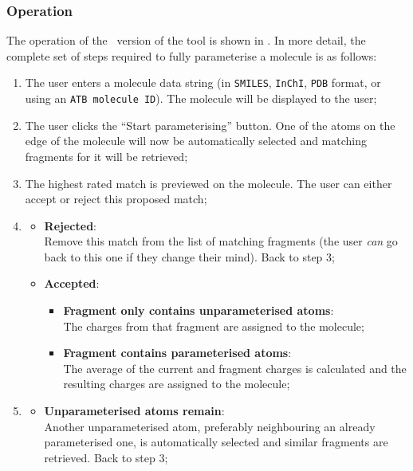 \subsubsection{Operation}
The operation of the \IDb\ version of the tool is shown in . In more detail, the complete set of steps required to fully parameterise a molecule is as follows:
\begin{enumerate}[itemsep=.1em, parsep=.2em, topsep=0em]
\item The user enters a molecule data string (in \verb|SMILES|, \verb|InChI|, \verb|PDB| format, or using an \verb|ATB molecule ID|). The molecule will be displayed to the user;
\item The user clicks the ``Start parameterising'' button. One of the atoms on the edge of the molecule will now be automatically selected and matching fragments for it will be retrieved;
\item The highest rated match is previewed on the molecule. The user can either accept or reject this proposed match;
\item
  \begin{itemize}[leftmargin=0cm, itemsep=.1em, parsep=.1em]
  \item[]{\bf Rejected}:\\Remove this match from the list of matching fragments (the user \emph{can} go back to this one if they change their mind). Back to step 3;
  \item[] {\bf Accepted}:
    \begin{itemize}[leftmargin=.5cm, itemsep=.1em, parsep=.1em]
    \item[] {\bf Fragment only contains unparameterised atoms}:\\
      The charges from that fragment are assigned to the molecule;
    \item[]{\bf Fragment contains parameterised atoms}:\\
      The average of the current and fragment charges is calculated and the resulting charges are assigned to the molecule;
    \end{itemize}
  \end{itemize}
\item
  \begin{itemize}[leftmargin=0cm, itemsep=.1em, parsep=.1em]
  \item[]{\bf Unparameterised atoms remain}:\\Another unparameterised atom, preferably neighbouring an already parameterised one, is automatically selected and similar fragments are retrieved. Back to step 3;

\end{itemize}
\end{enumerate}
